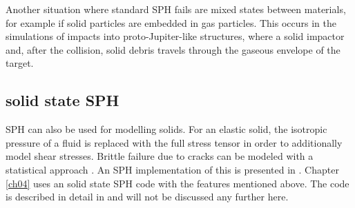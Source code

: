 Another situation where standard SPH fails are mixed states between materials, for example if solid particles are embedded in gas particles. This occurs in the simulations of impacts into proto-Jupiter-like structures, where a solid impactor and, after the collision, solid debris travels through the gaseous envelope of the target.

\subsection{solid state SPH}
SPH can also be used for modelling solids. For an elastic solid, the isotropic pressure of a fluid is replaced with the full stress tensor in order to additionally model shear stresses. Brittle failure due to cracks can be modeled with a statistical approach \cite{Grady1980147}. An SPH implementation of this is presented in \cite{1994Icar..107...98B}. Chapter \ref{ch04} uses an solid state SPH code with the features mentioned above. The code is described in detail in \cite{Nyffeler:2006p96} and will not be discussed any further here.


